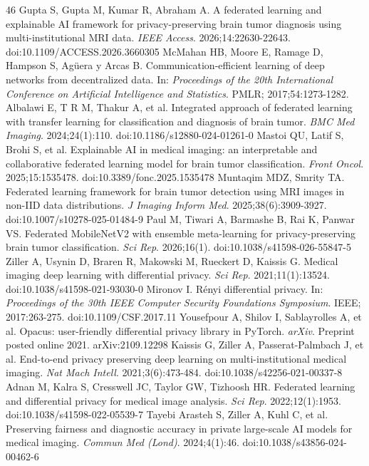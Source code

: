 \begin{thebibliography}{46}
 Gupta S, Gupta M, Kumar R, Abraham A. A federated learning and explainable AI framework for privacy-preserving brain tumor diagnosis using multi-institutional MRI data. \textit{IEEE Access}. 2026;14:22630-22643. doi:10.1109/ACCESS.2026.3660305
 McMahan HB, Moore E, Ramage D, Hampson S, Ag\"uera y Arcas B. Communication-efficient learning of deep networks from decentralized data. In: \textit{Proceedings of the 20th International Conference on Artificial Intelligence and Statistics}. PMLR; 2017;54:1273-1282.
 Albalawi E, T R M, Thakur A, et al. Integrated approach of federated learning with transfer learning for classification and diagnosis of brain tumor. \textit{BMC Med Imaging}. 2024;24(1):110. doi:10.1186/s12880-024-01261-0
 Mastoi QU, Latif S, Brohi S, et al. Explainable AI in medical imaging: an interpretable and collaborative federated learning model for brain tumor classification. \textit{Front Oncol}. 2025;15:1535478. doi:10.3389/fonc.2025.1535478
 Muntaqim MDZ, Smrity TA. Federated learning framework for brain tumor detection using MRI images in non-IID data distributions. \textit{J Imaging Inform Med}. 2025;38(6):3909-3927. doi:10.1007/s10278-025-01484-9
 Paul M, Tiwari A, Barmashe B, Rai K, Panwar VS. Federated MobileNetV2 with ensemble meta-learning for privacy-preserving brain tumor classification. \textit{Sci Rep}. 2026;16(1). doi:10.1038/s41598-026-55847-5
 Ziller A, Usynin D, Braren R, Makowski M, Rueckert D, Kaissis G. Medical imaging deep learning with differential privacy. \textit{Sci Rep}. 2021;11(1):13524. doi:10.1038/s41598-021-93030-0
 Mironov I. R\'enyi differential privacy. In: \textit{Proceedings of the 30th IEEE Computer Security Foundations Symposium}. IEEE; 2017:263-275. doi:10.1109/CSF.2017.11
 Yousefpour A, Shilov I, Sablayrolles A, et al. Opacus: user-friendly differential privacy library in PyTorch. \textit{arXiv}. Preprint posted online 2021. arXiv:2109.12298
 Kaissis G, Ziller A, Passerat-Palmbach J, et al. End-to-end privacy preserving deep learning on multi-institutional medical imaging. \textit{Nat Mach Intell}. 2021;3(6):473-484. doi:10.1038/s42256-021-00337-8
 Adnan M, Kalra S, Cresswell JC, Taylor GW, Tizhoosh HR. Federated learning and differential privacy for medical image analysis. \textit{Sci Rep}. 2022;12(1):1953. doi:10.1038/s41598-022-05539-7
 Tayebi Arasteh S, Ziller A, Kuhl C, et al. Preserving fairness and diagnostic accuracy in private large-scale AI models for medical imaging. \textit{Commun Med (Lond)}. 2024;4(1):46. doi:10.1038/s43856-024-00462-6

\end{thebibliography}
